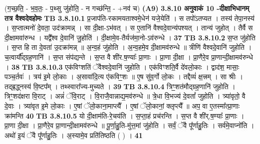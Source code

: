 \documentclass[17pt]{extarticle}
\begin{document}
{{{{{{{{{{{{{{{{{{{{{{                  \newline
                                    (ग॒च्छ॒ति॒ - भ॒व॒तः॒ - प॒थ्सु जु॑होति॒ - न गच्छ॑न्ति॒ - +नव॑ च) \textbf{(A9)} \newline \newline
                \textbf{ 3.8.10    अनुवाकं   10 -दीक्षाभिधानम् तत्र वैश्वदेवहोमः} \newline
                                \textbf{ TB 3.8.10.1} \newline
                  प्र॒जाप॑ति-रकामयताश्वमे॒धेन॑ यजे॒येति॑ । स तपो॑ऽतप्यत । तस्य॑ तेपा॒नस्य॑ । स॒प्तात्मनो॑ दे॒वता॒ उद॑क्रामन्न् । सा दी॒क्षा-ऽभ॑वत् । स ए॒तानि॑ वैश्वदे॒वान्य॑पश्यत् । तान्य॑ जुहोत् । तैर्वै स दी॒क्षामवा॑रुन्ध । यद्वै᳚श्व दे॒वानि॑ जु॒होति॑ । दी॒क्षामे॒व-तैर्यज॑मा॒नो-ऽव॑रुन्धे । \textbf{ 37} \newline
                  \newline
                                \textbf{ TB 3.8.10.2} \newline
                  स॒प्त जु॑होति । स॒प्त हि ता दे॒वता॑ उ॒दक्रा॑मन्न् ॥ अ॒न्व॒हं जु॑होति । अ॒न्व॒हमे॒व दी॒क्षामव॑रुन्धे ॥ त्रीणि॑ वैश्वदे॒वानि॑ जुहोति । च॒त्वार्यौ᳚द्ग्रह॒णानि॑ । स॒प्त संप॑द्यन्ते । स॒प्त वै शी॑र.ष॒ण्याः᳚ प्रा॒णाः । प्रा॒णा दी॒क्षा । प्रा॒णैरे॒व प्रा॒णान्दी॒क्षामव॑रुन्धे । \textbf{ 38} \newline
                  \newline
                                \textbf{ TB 3.8.10.3} \newline
                  एक॑विꣳशतिं ॅवैश्वदे॒वानि॑ जुहोति । एक॑विꣳशति॒र्वै दे॑वलो॒काः । द्वाद॑श॒ मासाः॒ पञ्च॒र्तवः॑ । त्रय॑ इ॒मे लो॒काः । अ॒सावा॑दि॒त्य ए॑कविꣳ॒॒शः ॥ ए॒ष सु॑व॒र्गो लो॒कः । तद्दैव्यं॑ क्ष॒त्त्रम् । सा श्रीः । तद्ब्र॒द्ध्नस्य॑ वि॒ष्टप᳚म् । तथ्स्वारा᳚ज्य-मुच्यते । \textbf{ 39} \newline
                  \newline
                                \textbf{ TB 3.8.10.4} \newline
                  त्रिꣳ॒॒शत॑मौद्ग्रह॒णानि॑ जुहोति । त्रिꣳ॒॒शद॑क्षरा वि॒राट् । अन्नं॑ ॅवि॒राट् । वि॒राजै॒वान्नाद्य॒मव॑रुन्धे ॥ त्रे॒धा वि॒भज्य॑ दे॒वतां᳚ जुहोति । त्र्या॑वृतो॒ वै दे॒वाः । त्र्या॑वृत इ॒मे लो॒काः । ए॒षां ॅलो॒काना॒माप्त्यै᳚ । ए॒षां ॅलो॒कानां॒ क्लृप्त्यै᳚ ॥ अप॒ वा ए॒तस्मा᳚त्प्रा॒णाः क्रा॑मन्ति \textbf{ 40} \newline
                  \newline
                                \textbf{ TB 3.8.10.5} \newline
                  यो दी॒क्षाम॑ति-रे॒चय॑ति । स॒प्ता॒हं प्रच॑रन्ति । स॒प्त वै शी॑र्.ष॒ण्याः᳚ प्रा॒णाः । प्रा॒णा दी॒क्षा । प्रा॒णैरे॒व प्रा॒णान्दी॒क्षामव॑रुन्धे ॥ पू॒र्णा॒हु॒ति-मु॑त्त॒मां जु॑होति । सर्वं॒ ॅवै पू᳚र्णाहु॒तिः । सर्व॑मे॒वाप्नो॑ति । अथो॑ इ॒यं ॅवै पू᳚र्णाहु॒तिः । अ॒स्यामे॒व प्रति॑तिष्ठति ( ) । \textbf{ 41} \newline
}}}}}}}}}}}}}}}}}}}}}}
\end{document}
